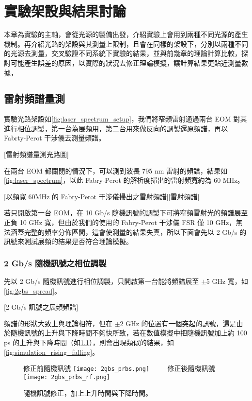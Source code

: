 \documentclass[class=NCU_thesis, crop=false]{standalone}
\begin{document}
\chapter{實驗架設與結果討論}
本章為實驗的主軸，會從光源的製備出發，介紹實驗上會用到兩種不同光源的產生機制。再介紹光路的架設與其測量上限制，且會在同樣的架設下，分別以兩種不同的光源去測量，交叉驗證不同系統下實驗的結果，並與前幾章的理論計算比較，探討可能產生誤差的原因，以實際的狀況去修正理論模擬，讓計算結果更貼近測量數據，

\section{雷射頻譜量測}

實驗光路架設如\cref{fig:laser_spectrum_setup}，我們將窄頻雷射通過兩台 EOM 對其進行相位調製，第一台為展頻用，第二台用來做反向的調製還原頻譜，再以 Fabrty-Perot 干涉儀去測量頻譜。

[雷射頻譜量測光路圖]

在兩台 EOM 都關閉的情況下，可以測到波長 795 nm 雷射的頻譜，結果如\cref{fig:laser_spectrum}，以此 Fabry-Perot 的解析度掃出的雷射頻寬約為 60 MHz。

[以頻寬 60MHz 的 Fabry-Perot 干涉儀掃出之雷射頻譜][雷射頻譜]


若只開啟第一台 EOM，在 10 Gb/s 隨機訊號的調製下可將窄頻雷射光的頻譜展至正負 10 GHz 寬，但由於我們的使用的 Fabry-Perot 干涉儀 FSR 僅 10 GHz，無法涵蓋完整的頻率分佈區間，這會使測量的結果失真，所以下面會先以 2 Gb/s 的訊號來測試展頻的結果是否符合理論模擬。

\subsection{2 Gb/s 隨機訊號之相位調製}
先以 2 Gb/s 隨機訊號進行相位調製，只開啟第一台能將頻譜展至 $\pm$5 GHz 寬，如\cref{fig:2gbs_spread}。

[2 Gb/s 訊號之展頻頻譜]

頻譜的形狀大致上與理論相符，但在 $\pm$2 GHz 的位置有一個突起的訊號，這是由於隨機訊號的上升與下降時間不夠快所致，若在數值模擬中把隨機訊號加上約 100 ps 的上升與下降時間（如\cref{fig:simulation_rising_falling_prbs}），則會出現類似的結果，如\cref{fig:simulation_rising_falling}。

\begin{figure}[!hbt]
    \centering
    \subcaptionbox
        {修正前隨機訊號
        \label{fig:subfig_fig1}}
        {\texttt{[image: 2gbs\_prbs.png]}}
    ~~~~
    \subcaptionbox
        {修正後隨機訊號
        \label{fig:subfig_fig2}}
        {\texttt{[image: 2gbs\_prbs\_rf.png]}}
    \caption{隨機訊號修正，加上上升時間與下降時間。}
    \label{fig:simulation_rising_falling_prbs}
\end{figure}
\end{document}
